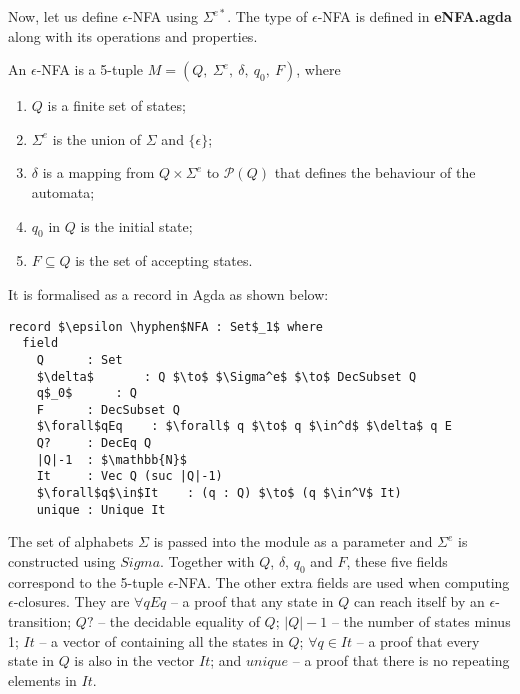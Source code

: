 \par Now, let us define \(\epsilon\)-NFA using \(\Sigma^{e*}\). The
type of \(\epsilon\)-NFA is defined in \textbf{eNFA.agda} along with its operations and
properties. 

\begin{defn}
\noindent An \(\epsilon\)-NFA is a 5-tuple \(M = (Q
,\ \Sigma^e,\ \delta,\ q_0,\ F)\), where
\begin{enumerate}[nolistsep]
  \item \(Q\) is a finite set of states;
  \item \(\Sigma^e\) is the union of \(\Sigma\) and \(\{\epsilon\}\);
  \item \(\delta\) is a mapping from \(Q \times \Sigma^e\) to
    \(\mathcal P \left({Q}\right)\) that defines the behaviour of the automata;
  \item \(q_0\) in \(Q\) is the initial state;
  \item \(F \subseteq Q\) is the set of accepting states. 
\end{enumerate}
\end{defn}

\par It is formalised as a record in Agda as shown below: 

\begin{lstlisting}[mathescape=true,xleftmargin=.3\textwidth]
record $\epsilon \hyphen$NFA : Set$_1$ where
  field
    Q      : Set
    $\delta$       : Q $\to$ $\Sigma^e$ $\to$ DecSubset Q
    q$_0$      : Q
    F      : DecSubset Q
    $\forall$qEq    : $\forall$ q $\to$ q $\in^d$ $\delta$ q E
    Q?     : DecEq Q
    |Q|-1  : $\mathbb{N}$
    It     : Vec Q (suc |Q|-1)
    $\forall$q$\in$It    : (q : Q) $\to$ (q $\in^V$ It)
    unique : Unique It
\end{lstlisting}

\par The set of alphabets \(\Sigma\) is passed into the module as a
parameter and \(\Sigma^e\) is constructed using \(Sigma\). Together with \(Q\), \(\delta\),
\(q_0\) and \(F\), these five fields correspond to the 5-tuple
\(\epsilon\)-NFA. The other extra fields are used when computing
\(\epsilon\)-closures. They are \(\forall qEq\) -- a proof that any
state in \(Q\) can reach itself by an
\(\epsilon\)-transition; \(Q?\) -- the decidable equality of \(Q\);
\(|Q|-1\) -- the number of states minus 1; \(It\) -- a vector of
containing all the states in \(Q\); \(\forall q\in It\)
-- a proof that every state in \(Q\) is also in the vector
\(It\); and \(unique\) -- a proof that there is no repeating elements in
\(It\). 

